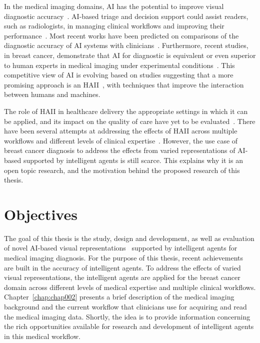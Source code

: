 In the medical imaging domains, \ac{AI} has the potential to improve visual diagnostic accuracy~\cite{Tschandl2020}.
\ac{AI}-based triage and decision support could assist readers, such as radiologists, in managing clinical workflows and improving their performance~\cite{doi:10.1148/ryai.2020190208}.
Most recent works have been predicted on comparisons of the diagnostic accuracy of \ac{AI} systems with clinicians~\cite{He2019, 10.1145/3313831.3376290}.
Furthermore, recent studies, in breast cancer, demonstrate that AI for diagnostic is equivalent or even superior to human experts in medical imaging under experimental conditions~\cite{Ribli2018, McKinney2020}.
This competitive view of AI is evolving based on studies suggesting that a more promising approach is an \ac{HAII}~\cite{10.1145/3313831.3376807, 10.1145/3290605.3300233, 10.1145/3411286, 10.1145/3313831.3376301}, with techniques that improve the interaction between humans and machines.

The role of \ac{HAII} in healthcare delivery the appropriate settings in which it can be applied, and its impact on the quality of care have yet to be evaluated~\cite{Tschandl2020}.
There have been several attempts at addressing the effects of \ac{HAII} across multiple workflows and different levels of clinical expertise~\cite{doi:10.1148/radiol.2019182627, doi:10.1148/ryai.2020200057}.
However, the use case of breast cancer diagnosis to address the effects from varied representations of \ac{AI}-based supported by intelligent agents is still scarce.
This explains why it is an open topic research, and the motivation behind the proposed research of this thesis.

\section{Objectives}
\label{sec:sec001002}

The goal of this thesis is the study, design and development, as well as evaluation of novel \ac{AI}-based visual representations~\cite{https://doi.org/10.13140/rg.2.2.29816.70409} supported by intelligent agents for medical imaging diagnosis.
For the purpose of this thesis, recent achievements~\cite{Tschandl2020, 9098470, MAICAS2019101562} are built in the accuracy of intelligent agents.
To address the effects of varied visual representations, the intelligent agents are applied for the breast cancer domain across different levels of medical expertise and multiple clinical workflows.
Chapter~\ref{chap:chap002} presents a brief description of the medical imaging background and the current workflow that clinicians use for acquiring and read the medical imaging data.
Shortly, the idea is to provide information concerning the rich opportunities available for research and development of intelligent agents in this medical workflow.

